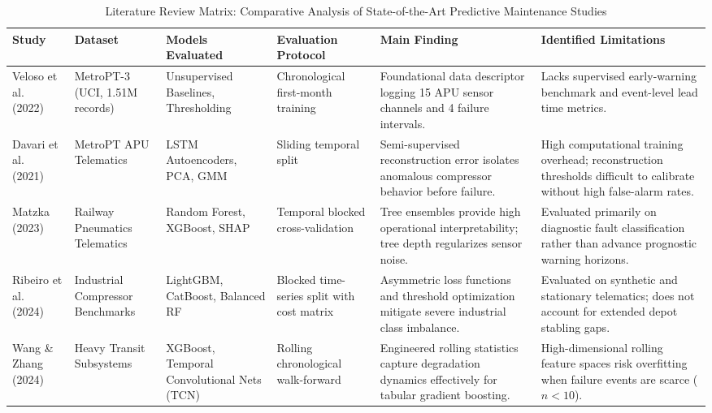 \documentclass[10pt,twocolumn,a4paper]{article}
\begin{document}
\begin{table}[t]
\centering
\caption{Literature Review Matrix: Comparative Analysis of State-of-the-Art Predictive Maintenance Studies}
\label{tab:literature}
\small
\begin{tabularx}{\textwidth}{p{2.5cm}p{2.5cm}p{2.5cm}p{2.8cm}Xp{2.8cm}}
\toprule
\textbf{Study} & \textbf{Dataset} & \textbf{Models Evaluated} & \textbf{Evaluation Protocol} & \textbf{Main Finding} & \textbf{Identified Limitations} \\
\midrule
Veloso et al. (2022)~\cite{veloso2022metropt} & MetroPT-3 (UCI, 1.51M records) & Unsupervised Baselines, Thresholding & Chronological first-month training & Foundational data descriptor logging 15 APU sensor channels and 4 failure intervals. & Lacks supervised early-warning benchmark and event-level lead time metrics. \\
\addlinespace
Davari et al. (2021)~\cite{davari2021predictive} & MetroPT APU Telematics & LSTM Autoencoders, PCA, GMM & Sliding temporal split & Semi-supervised reconstruction error isolates anomalous compressor behavior before failure. & High computational training overhead; reconstruction thresholds difficult to calibrate without high false-alarm rates. \\
\addlinespace
Matzka (2023)~\cite{matzka2023explainable} & Railway Pneumatics Telematics & Random Forest, XGBoost, SHAP & Temporal blocked cross-validation & Tree ensembles provide high operational interpretability; tree depth regularizes sensor noise. & Evaluated primarily on diagnostic fault classification rather than advance prognostic warning horizons. \\
\addlinespace
Ribeiro et al. (2024)~\cite{ribeiro2024timeseries} & Industrial Compressor Benchmarks & LightGBM, CatBoost, Balanced RF & Blocked time-series split with cost matrix & Asymmetric loss functions and threshold optimization mitigate severe industrial class imbalance. & Evaluated on synthetic and stationary telematics; does not account for extended depot stabling gaps. \\
\addlinespace
Wang \& Zhang (2024)~\cite{wang2024gradient} & Heavy Transit Subsystems & XGBoost, Temporal Convolutional Nets (TCN) & Rolling chronological walk-forward & Engineered rolling statistics capture degradation dynamics effectively for tabular gradient boosting. & High-dimensional rolling feature spaces risk overfitting when failure events are scarce ($n < 10$). \\
\bottomrule
\end{tabularx}
\end{table}
\end{document}
